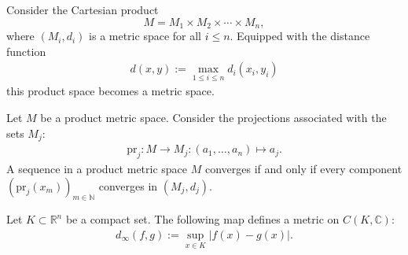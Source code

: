     \begin{example}
        Consider the Cartesian product \[M = M_1\times M_2\times\cdots\times M_n,\] where $(M_i,d_i)$ is a metric space for all $i\leq n$. Equipped with the distance function
        \begin{gather}
            d(x,y) := \max_{1\leq i\leq n}d_i(x_i,y_i)
        \end{gather}
        this product space becomes a metric space.
    \end{example}
    \begin{property}\label{metric:projection}
        Let $M$ be a product metric space. Consider the projections associated with the sets $M_j$:
        \begin{gather}
            \mathrm{pr}_j:M\rightarrow M_j:(a_1,\ldots,a_n)\mapsto a_j.
        \end{gather}
        A sequence in a product metric space $M$ converges if and only if every component $(\mathrm{pr}_j(x_m))_{m\in\mathbb{N}}$ converges in $(M_j, d_j)$.
    \end{property}

    \begin{example}\label{metric:supremum_distance}
        Let $K\subset\mathbb{R}^n$ be a compact set. The following map defines a metric on $C(K,\mathbb{C})$:
        \begin{gather}
            d_\infty(f,g) := \sup_{x\in K}|f(x) - g(x)|.
        \end{gather}
    \end{example}

